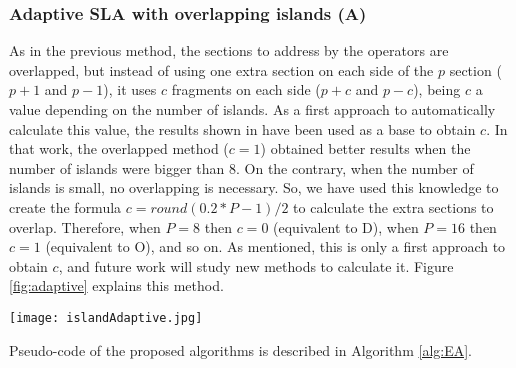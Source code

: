 \documentclass[preprint]{elsarticle}
\begin{document}
\subsubsection{Adaptive SLA with overlapping islands (A)} 
As in the previous method, the sections to address by the operators are overlapped, but
instead of using one extra section on each side of the $p$ section ($p+1$
and $p-1$), it uses $c$ fragments on each side ($p+c$ and $p-c$),
being $c$ a value depending on the number of islands.
As a first
approach to automatically calculate this value, the results shown in
\citep{Garcia16hpmoon} have been used as a base to obtain $c$. In that
work, the overlapped method ($c=1$) obtained better results when the
number of islands were bigger than 8. On the contrary, when the number of
islands is small, no overlapping is necessary. So, we have used this
knowledge to create the formula $c=round(0.2*P-1)/2$ to calculate the
extra sections to overlap. Therefore, when $P=8$ then $c=0$
(equivalent to D), when $P=16$ then $c=1$ (equivalent to O), and so
on. As mentioned, this is only a first approach to obtain $c$, and future work will study new methods to calculate it. Figure \ref{fig:adaptive} explains this method. 

\begin{figure*}[h!tb]
\centering
\texttt{[image: islandAdaptive.jpg]}
\caption{Adaptive SLA with overlapping islands (A): every island $p$ modifies the  $p+c$,
  $p_{th}$ and $p-c$  components (in grey) of the individuals. $c$ is calculated depending on the number of islands. In this case, $c=2$.}
  \label{fig:adaptive}
\end{figure*}

Pseudo-code of the proposed algorithms is described in Algorithm \ref{alg:EA}.
\end{document}
